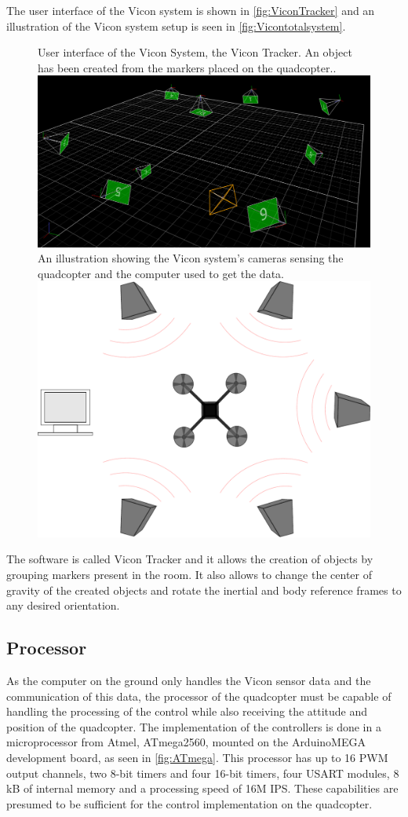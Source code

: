 The user interface of the Vicon system is shown in \autoref{fig:ViconTracker} and an illustration of the Vicon system setup is seen in \autoref{fig:Vicontotalsystem}. 
%
\begin{figure}[H]
	\centering
	\captionbox
	{
		User interface of the Vicon System, the Vicon Tracker. An object has been created from the markers placed on the quadcopter..
		\label{fig:ViconTracker}
	}
	{
	\includegraphics[width=.5\textwidth]{figures/ViconTracker3}
	}
  \hspace{5pt}
  \captionbox
  {
  	An illustration showing the Vicon system's cameras sensing the quadcopter and the computer used to get the data.
  	\label{fig:Vicontotalsystem}
  }
  {
  	\includegraphics[width=.40\textwidth]{figures/system.pdf}
  }
\end{figure}
The software is called Vicon Tracker and it allows the creation of objects by grouping markers present in the room. It also allows to change the center of gravity of the created objects and rotate the inertial and body reference frames to any desired orientation.

\subsection{Processor}
As the computer on the ground only handles the Vicon sensor data and the communication of this data, the processor of the quadcopter must be capable of handling the processing of the control while also receiving the attitude and position of the quadcopter.
The implementation of the controllers is done in a microprocessor from Atmel, ATmega2560, mounted on the ArduinoMEGA development board, as seen in \autoref{fig:ATmega}. This processor has up to 16 PWM output channels, two 8-bit timers and four 16-bit timers, four USART modules, 8 kB of internal memory and a processing speed of 16M IPS. These capabilities are presumed to be sufficient for the control implementation on the quadcopter.\cite{ATmega2560}

